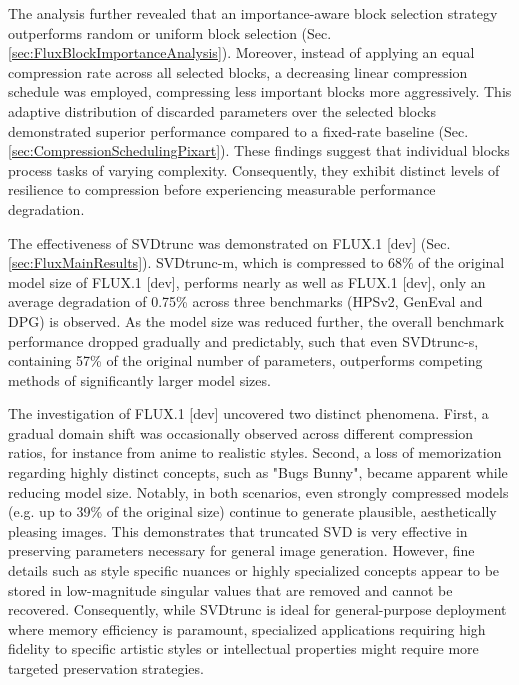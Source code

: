 The analysis further revealed that an importance-aware block selection strategy outperforms random or uniform block selection (Sec. \ref{sec:FluxBlockImportanceAnalysis}). Moreover, instead of applying an equal compression rate across all selected blocks, a decreasing linear compression schedule was employed, compressing less important blocks more aggressively. This adaptive distribution of discarded parameters over the selected blocks demonstrated superior performance compared to a fixed-rate baseline (Sec. \ref{sec:CompressionSchedulingPixart}). These findings suggest that individual blocks process tasks of varying complexity. Consequently, they exhibit distinct levels of resilience to compression before experiencing measurable performance degradation.

The effectiveness of \gls{SVD}trunc was demonstrated on FLUX.1 {[dev]} (Sec. \ref{sec:FluxMainResults}).  \gls{SVD}trunc-m, which is compressed to 68\% of the original model size of FLUX.1 {[dev]}, performs nearly as well as FLUX.1 {[dev]}, only an average degradation of 0.75\% across three benchmarks (HPSv2, GenEval and DPG) is observed. As the model size was reduced further, the overall benchmark performance dropped gradually and predictably, such that even \gls{SVD}trunc-s, containing 57\% of the original number of parameters, outperforms competing methods of significantly larger model sizes. 


The investigation of FLUX.1 {[dev]} uncovered two distinct phenomena. First, a gradual domain shift was occasionally observed across different compression ratios, for instance from anime to realistic styles. Second, a loss of memorization regarding highly distinct concepts, such as "Bugs Bunny", became apparent while reducing model size. Notably, in both scenarios, even strongly compressed models (e.g. up to 39\% of the original size) continue to generate plausible, aesthetically pleasing images. This demonstrates that truncated \gls{SVD} is very effective in preserving parameters necessary for general image generation. However, fine details such as style specific nuances or highly specialized concepts appear to be stored in low-magnitude singular values that are removed and cannot be recovered. Consequently, while \gls{SVD}trunc is ideal for general-purpose deployment where memory efficiency is paramount, specialized applications requiring high fidelity to specific artistic styles or intellectual properties might require more targeted preservation strategies.


